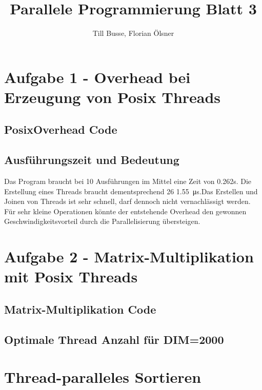 \documentclass[12pt,a4paper]{article}
\author{Till Busse, Florian Ölsner}
\title{Parallele Programmierung Blatt 3}
\begin{document}
\maketitle
\pagebreak
\section{Aufgabe 1 - Overhead bei Erzeugung von Posix Threads}
\subsection{PosixOverhead Code}
\lstset{escapechar=@,style=customc}


\subsection{Ausführungszeit und Bedeutung}
Das Program braucht bei 10 Ausführungen im Mittel eine Zeit von 0.262s. Die Erstellung eines Threads braucht dementsprechend 26 \SI{1.55}{\micro\second}.Das Erstellen und Joinen von Threads ist sehr schnell, darf dennoch nicht vernachlässigt werden. Für sehr kleine Operationen könnte der entstehende Overhead den gewonnen Geschwindigkeitsvorteil durch die Parallelisierung übersteigen.
\pagebreak
\section{Aufgabe 2 - Matrix-Multiplikation mit Posix Threads}
\subsection{Matrix-Multiplikation Code}

\subsection{Optimale Thread Anzahl für DIM=2000}
\section{Thread-paralleles Sortieren}
\end{document}
